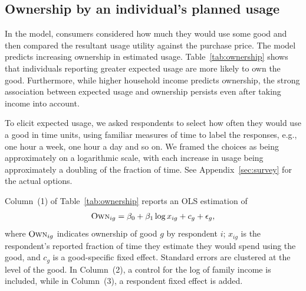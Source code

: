 \documentclass[11pt]{article}
\begin{document}
\subsection{Ownership by an individual's planned usage} 
In the model, consumers considered how much they would use some good and then compared the resultant usage utility against the purchase price. 
The model predicts increasing ownership in estimated usage.
Table~\ref{tab:ownership} shows that individuals reporting greater expected usage are more likely to own the good.
Furthermore, while higher household income predicts ownership, the strong association between expected usage and ownership persists even after taking income into account.

To elicit expected usage, we asked respondents to select how often they would use a good in time units, using familiar measures of time to label the responses, e.g., one hour a week, one hour a day and so on.
We framed the choices as being approximately on a logarithmic scale, with each increase in usage being approximately a doubling of the fraction of time.
See Appendix~\ref{sec:survey} for the actual options.

Column~(1) of Table~\ref{tab:ownership} reports an OLS estimation of 
\begin{align} \label{eq:base_own}
\textsc{Own}_{ig} = \beta_0 + \beta_1 \log x_{ig} + c_{g} + \epsilon_{g}, 
\end{align}
where $\textsc{Own}_{ig}$ indicates ownership of good $g$ by respondent $i$; 
$x_{ig}$ is the respondent's reported fraction of time they estimate they would spend using the good, and $c_g$ is a good-specific fixed effect.
Standard errors are clustered at the level of the good. 
In Column~(2), a control for the log of family income is included, while in Column~(3), a respondent fixed effect is added. 


\end{document}
